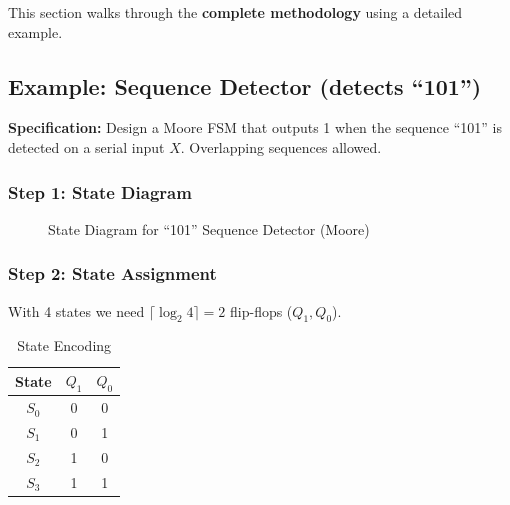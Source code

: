 \documentclass[12pt,a4paper]{article}
\begin{document}
This section walks through the \textbf{complete methodology} using a detailed example.

\subsection{Example: Sequence Detector (detects ``101'')}

\textbf{Specification:} Design a Moore FSM that outputs 1 when the sequence ``101'' is detected on a serial input $X$. Overlapping sequences allowed.

\subsubsection{Step 1: State Diagram}

\begin{figure}[H]
\centering
{}
\caption{State Diagram for ``101'' Sequence Detector (Moore)}
\end{figure}

\subsubsection{Step 2: State Assignment}

With 4 states we need $\lceil\log_2 4\rceil = 2$ flip-flops ($Q_1, Q_0$).

\begin{table}[H]
\centering
\begin{tabular}{c|cc}
\toprule
State & $Q_1$ & $Q_0$ \\
\midrule
$S_0$ & 0 & 0 \\
$S_1$ & 0 & 1 \\
$S_2$ & 1 & 0 \\
$S_3$ & 1 & 1 \\
\bottomrule
\end{tabular}
\caption{State Encoding}
\end{table}
\end{document}
